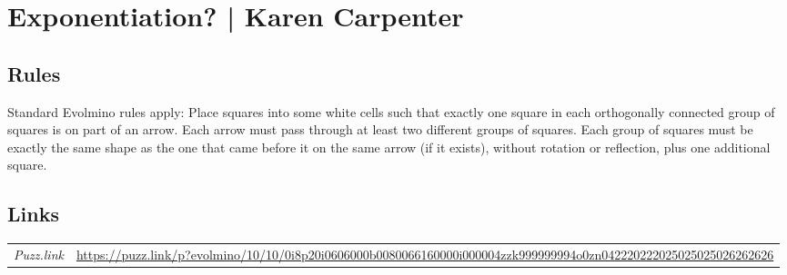 \section{Exponentiation? | {\normalfont Karen Carpenter}}
\label{sec:20-exponentiation-karen-carpenter}

\subsection*{Rules}
\begin{markdown}
Standard Evolmino rules apply: Place squares into some white cells such that exactly one square in each orthogonally connected group of squares is on part of an arrow. Each arrow must pass through at least two different groups of squares. Each group of squares must be exactly the same shape as the one that came before it on the same arrow (if it exists), without rotation or reflection, plus one additional square.
\end{markdown}
\subsection*{Links}
\begin{tabularx}{\textwidth}{l X}
\emph{Puzz.link} & \url{https://puzz.link/p?evolmino/10/10/0i8p20i0606000b0080066160000i000004zzk999999994o0zn042220222025025025026262626} \\
\end{tabularx}
\pagebreak

